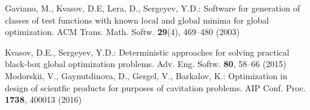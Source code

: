 \documentclass[smallextended]{svjour3}       %
\begin{document}
\begin{thebibliography}{}
 Gaviano, M., Kvasov, D.E, Lera, D., Sergeyev, Y.D.: Software for generation of classes of test functions with known local and global minima for global optimization. ACM Trans. Math. Softw. \textbf{29}(4), 469--480 (2003)


 Kvasov, D.E., Sergeyev, Y.D.: Deterministic approaches for solving practical black-box global optimization problems. Adv. Eng. Softw. \textbf{80}, 58--66 (2015)
 Modorskii, V., Gaynutdinova, D., Gergel, V., Barkalov, K.: Optimization in design of scientfic products for purposes of cavitation problems. AIP Conf. Proc. \textbf{1738}, 400013 (2016)








\end{thebibliography}
\end{document}
